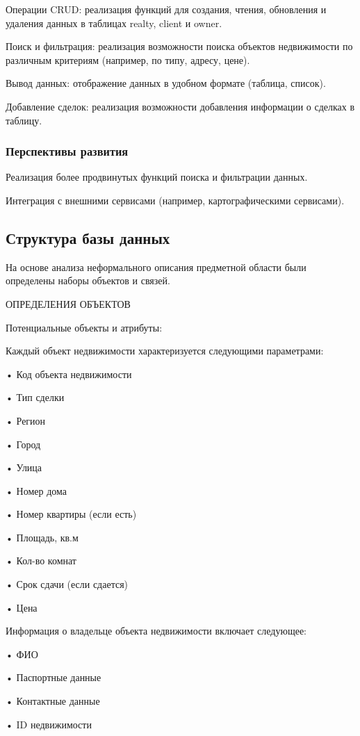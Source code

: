Операции CRUD: реализация функций для создания, чтения, обновления и удаления данных в таблицах realty, client и owner.

Поиск и фильтрация: реализация возможности поиска объектов недвижимости по различным критериям (например, по типу, адресу, цене).

Вывод данных: отображение данных в удобном формате (таблица, список).

Добавление сделок: реализация возможности добавления информации о сделках в таблицу.

\subsubsection{Перспективы развития}

Реализация более продвинутых функций поиска и фильтрации данных.

Интеграция с внешними сервисами (например, картографическими сервисами).

\subsection{Структура базы данных}

На основе анализа неформального описания предметной области были определены наборы объектов и связей. 

ОПРЕДЕЛЕНИЯ ОБЪЕКТОВ

Потенциальные объекты и атрибуты:

Каждый объект недвижимости характеризуется следующими параметрами:

•	Код объекта недвижимости

•	Тип сделки

•	Регион

•	Город

•	Улица

•	Номер дома

•	Номер квартиры (если есть)

•	Площадь, кв.м

•	Кол-во комнат

•	Срок сдачи (если сдается)

•	Цена

Информация о владельце объекта недвижимости включает следующее:

•	ФИО

•	Паспортные данные

•	Контактные данные

•	ID недвижимости

